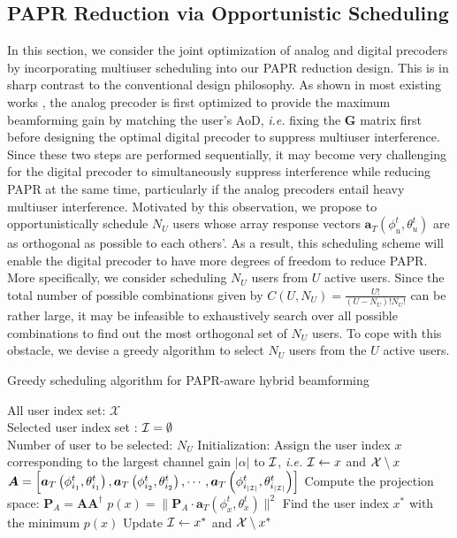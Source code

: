 \documentclass[conference]{IEEEtran}
\begin{document}
\subsection{PAPR Reduction via Opportunistic Scheduling}
In this section, we consider the joint optimization of analog and digital precoders by incorporating multiuser scheduling into our PAPR reduction design. This is in sharp contrast to the conventional design philosophy. As shown in most existing works \cite{alkhateeb2015limited}, the analog precoder is first optimized to provide the maximum beamforming gain by matching the user's AoD, {\em i.e.} fixing the ${\bm G}$ matrix first before designing the optimal digital precoder to suppress multiuser interference. Since these two steps are performed sequentially, it may become very challenging for the digital precoder to simultaneously suppress interference while reducing PAPR at the same time, particularly if the analog precoders entail heavy multiuser interference. Motivated by this observation, we propose to opportunistically schedule $N_U$ users whose array response vectors $\bm{a}_{T}(\phi^t_u,\theta^t_u)$ are as orthogonal as possible to each others'. As a result, this scheduling scheme will enable the digital precoder to have more degrees of freedom to reduce PAPR. More specifically, we consider scheduling $N_U$ users from $U$ active users. Since the total number of possible combinations given by $C\left(U, N_U\right)=\frac{U!}{(U-N_U)!N_U!}$ can be rather large, it may be infeasible to exhaustively search over all possible combinations to find out the most orthogonal set of $N_U$ users. To cope with this obstacle, we devise a greedy algorithm to select $N_U$ users from the $U$ active users.

\begin{algorithm}[h] 		
	\caption{Greedy scheduling algorithm for PAPR-aware hybrid beamforming}
	\label{selection}
	\begin{algorithmic}
		\REQUIRE  \quad
		\STATE	All user index set: $\mathcal{X}$\\
		\STATE  Selected user index set : $\cal{I}=\emptyset$\\
		\STATE  Number of user to be selected: $N_U$
		\ENSURE   	
		\STATE Initialization: Assign the user index $x$ corresponding to the largest channel gain $|\alpha|$ to ${\cal I}$, {\em i.e.} ${\cal I} \leftarrow  x$ and ${\cal X}\setminus x$	
        \STATE ${\bm A}=\left[\bm{a}_{T}\left(\phi^t_{i_1},\theta^t_{i_1}\right),\bm{a}_{T}\left(\phi^t_{i_2},\theta^t_{i_2}\right),\cdots,\bm{a}_{T}\left(\phi^t_{i_{|{\cal I}|}},\theta^t_{i_{|{\cal I}|}}\right)\right]$
        \STATE Compute the projection space: ${\bm P}_A = {\bm A}{\bm A}^{\dagger}$ 		 				
		\STATE $p(x) = \|{\bm P}_A\cdot {\bm a}_T\left(\phi^t_{x},\theta^t_{x}\right)\|^2$ 				 								
		\ENDFOR
		\STATE  Find the user index $x^*$ with the minimum $p(x)$ 									
		\STATE	Update ${\cal I} \leftarrow  x^*$ and ${\cal X}\setminus x^*$	
		\ENDWHILE	
	\end{algorithmic}
\end{algorithm}
\end{document}
